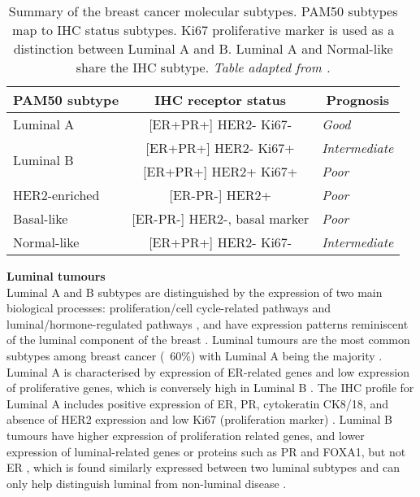 \begin{table}[!h]
\centering
\caption[Summary of the breast cancer molecular subtypes.]{Summary of the breast cancer molecular subtypes. PAM50 subtypes map to IHC status subtypes. Ki67 proliferative marker is used as a distinction between Luminal A and B. Luminal A and Normal-like share the IHC subtype. \textit{Table adapted from \cite{Dai2015}.}}
\label{table:pam50summary}
\begin{tabular}{l|c|l}
\multicolumn{1}{c|}{\textbf{PAM50  subtype}} & \textbf{IHC receptor status} & \multicolumn{1}{c}{\textbf{Prognosis}} \\ \hline
\multicolumn{1}{|l|}{Luminal A} & {[}ER+PR+{]} HER2- Ki67- & \multicolumn{1}{l|}{\textit{Good}} \\ \hline
\multicolumn{1}{|l|}{\multirow{2}{*}{Luminal B}} & {[}ER+PR+{]} HER2- Ki67+ & \multicolumn{1}{l|}{\textit{Intermediate}} \\ \cline{2-3} 
\multicolumn{1}{|l|}{} & {[}ER+PR+{]} HER2+ Ki67+ & \multicolumn{1}{l|}{\textit{Poor}} \\ \hline
\multicolumn{1}{|l|}{HER2-enriched} & {[}ER-PR-{]} HER2+ & \multicolumn{1}{l|}{\textit{Poor}} \\ \hline
\multicolumn{1}{|l|}{Basal-like} & {[}ER-PR-{]} HER2-, basal marker & \multicolumn{1}{l|}{\textit{Poor}} \\ \hline
\multicolumn{1}{|l|}{Normal-like} & {[}ER+PR+{]} HER2- Ki67- & \multicolumn{1}{l|}{\textit{Intermediate}} \\ \hline
\end{tabular}
\end{table}
    

\textbf{Luminal tumours}\\
Luminal A and B subtypes are distinguished by the expression of two main biological processes: proliferation/cell cycle-related pathways and luminal/hormone-regulated pathways \cite{Vidal2017}, and have expression patterns reminiscent of the luminal component of the breast \cite{perou2000molecular}. Luminal tumours are the most common subtypes among breast cancer (~60\%) with Luminal A being the majority \cite{Dai2015}.  Luminal A is characterised by expression of ER-related genes and low expression of proliferative genes, which is conversely high in Luminal B \cite{eroles2012molecular}. The IHC profile for Luminal A includes positive expression of ER, PR, cytokeratin CK8/18, and absence of HER2 expression and low Ki67 (proliferation marker) \cite{Vidal2017}. Luminal B tumours have higher expression of proliferation related genes, and lower expression of luminal-related genes or proteins such as PR and FOXA1, but not ER \cite{prat2012prognostic}, which is found similarly expressed between two luminal subtypes and can only help distinguish luminal from non-luminal disease \cite{Vidal2017}.

